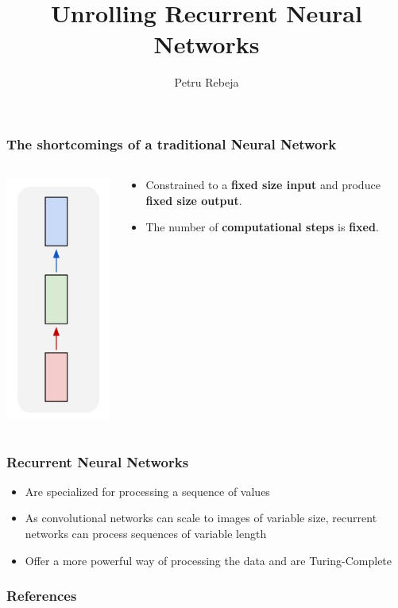 \documentclass{beamer}
\title{Unrolling Recurrent Neural Networks}
\author{Petru Rebeja}
\begin{document}
\maketitle
\begin{frame}
  \frametitle{The shortcomings of a traditional Neural Network \cite{rnn-efectiveness}}
  \begin{columns}
    \begin{column}{0.3\textwidth}
      \begin{center}
        \includegraphics[height=0.7\textheight]{../img/vanilla-nn.png}
      \end{center}
    \end{column}
    \begin{column}{0.7\textwidth}
      \begin{itemize}
        \item Constrained to a \textbf{fixed size input} and produce \textbf{fixed size output}.
        \item The number of \textbf{computational steps} is \textbf{fixed}.
      \end{itemize}
    \end{column}
  \end{columns}
\end{frame}
\begin{frame}
  \frametitle{Recurrent Neural Networks}
  \begin{itemize}
    \item Are specialized for processing a sequence of values \cite{goodfellow-et-al-2016}
    \item As convolutional networks can scale to images of variable size, recurrent networks can process sequences of variable length \cite{goodfellow-et-al-2016}
    \item Offer a more powerful way of processing the data \cite{rnn-lecture} and are Turing-Complete \cite{siegelmann1995}
  \end{itemize}
\end{frame}
\begin{frame}[allowframebreaks]
  \frametitle{References}
  
  
\end{frame}
\end{document}
